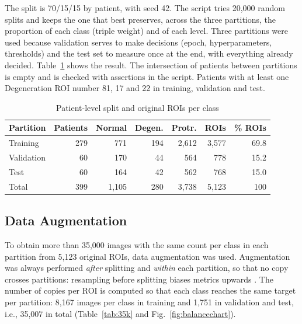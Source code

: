 The split is 70/15/15 by patient, with seed 42. The script tries 20,000 random splits and keeps the one that best preserves, across the three partitions, the proportion of each class (triple weight) and of each level. Three partitions were used because validation serves to make decisions (epoch, hyperparameters, thresholds) and the test set to measure once at the end, with everything already decided. Table~\ref{tab:split} shows the result. The intersection of patients between partitions is empty and is checked with assertions in the script. Patients with at least one Degeneration ROI number 81, 17 and 22 in training, validation and test.

\begin{table}[!htb]
\centering\footnotesize
\setlength{\tabcolsep}{3.5pt}
\caption{Patient-level split and original ROIs per class}
\label{tab:split}
\begin{tabular}{lrrrrrr}
\toprule
Partition & Patients & Normal & Degen. & Protr. & ROIs & \% ROIs \\
\midrule
Training   & 279 & 771   & 194 & 2,612 & 3,577 & 69.8 \\
Validation & 60  & 170   & 44  & 564   & 778   & 15.2 \\
Test       & 60  & 164   & 42  & 562   & 768   & 15.0 \\
\midrule
Total      & 399 & 1,105 & 280 & 3,738 & 5,123 & 100 \\
\bottomrule
\end{tabular}
\end{table}

\subsection{Data Augmentation}
\label{sec:augmentation}
To obtain more than 35,000 images with the same count per class in each partition from 5,123 original ROIs, data augmentation was used. Augmentation was always performed \emph{after} splitting and \emph{within} each partition, so that no copy crosses partitions: resampling before splitting biases metrics upwards \cite{demircioglu2024}. The number of copies per ROI is computed so that each class reaches the same target per partition: 8,167 images per class in training and 1,751 in validation and test, i.e., 35,007 in total (Table~\ref{tab:35k} and Fig.~\ref{fig:balancechart}).

